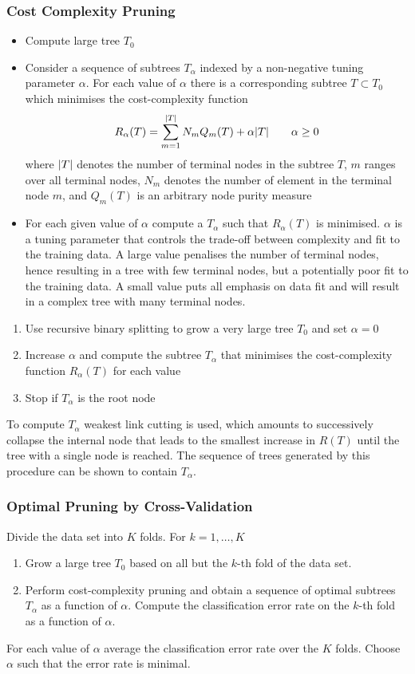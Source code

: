 \documentclass[11pt]{article}
\theoremstyle{definition}
\DeclarePairedDelimiter\abs{\lvert}{\rvert}
\begin{document}
\subsubsection{Cost Complexity Pruning}
\begin{itemize}
	\item Compute large tree $T_0$
	\item Consider a sequence of subtrees $T_\alpha$ indexed by a non-negative tuning parameter $\alpha$. For each value of $\alpha$ there is a corresponding subtree $T\subset T_0$ which minimises the cost-complexity function
	\begin{equation*}
		R_{\alpha}(T) = \sum_{m=1}^{\abs{T}} N_m Q_m (T) + \alpha\abs{T}\qquad \alpha\geq 0
	\end{equation*}
	where $\abs{T}$ denotes the number of terminal nodes in the subtree $T$, $m$ ranges over all terminal nodes, $N_m$ denotes the number of element in the terminal node $m$, and $Q_m(T)$ is an arbitrary node purity measure
	\item For each given value of $\alpha$ compute a $T_\alpha$ such that $R_{\alpha}(T)$ is minimised. $\alpha$ is a tuning parameter that controls the trade-off between complexity and fit to the training data. A large value penalises the number of terminal nodes, hence resulting in a tree with few terminal nodes, but a potentially poor fit to the training data. A small value puts all emphasis on data fit and will result in a complex tree with many terminal nodes.
\end{itemize}
\begin{enumerate}
	\item Use recursive binary splitting to grow a very large tree $T_0$ and set $\alpha = 0$
	\item Increase $\alpha$ and compute the subtree $T_\alpha$ that minimises the cost-complexity function $R_\alpha(T)$ for each value
	\item Stop if $T_\alpha$ is the root node
\end{enumerate}
To compute $T_\alpha$ weakest link cutting is used, which amounts to successively collapse the internal node that leads to the smallest increase in $R(T)$ until the tree with a single node is reached. The sequence of trees generated by this procedure can be shown to contain $T_\alpha$.

\subsubsection{Optimal Pruning by Cross-Validation}
Divide the data set into $K$ folds. For $k = 1,\dots,K$
\begin{enumerate}
	\item Grow a large tree $T_0$ based on all but the $k$-th fold of the data set.
	\item Perform cost-complexity pruning and obtain a sequence of optimal subtrees $T_\alpha$ as a function of $\alpha$. Compute the classification error rate on the $k$-th fold as a function of $\alpha$.
\end{enumerate}
For each value of $\alpha$ average the classification error rate over the $K$ folds. Choose $\alpha$ such that the error rate is minimal.
\end{document}

